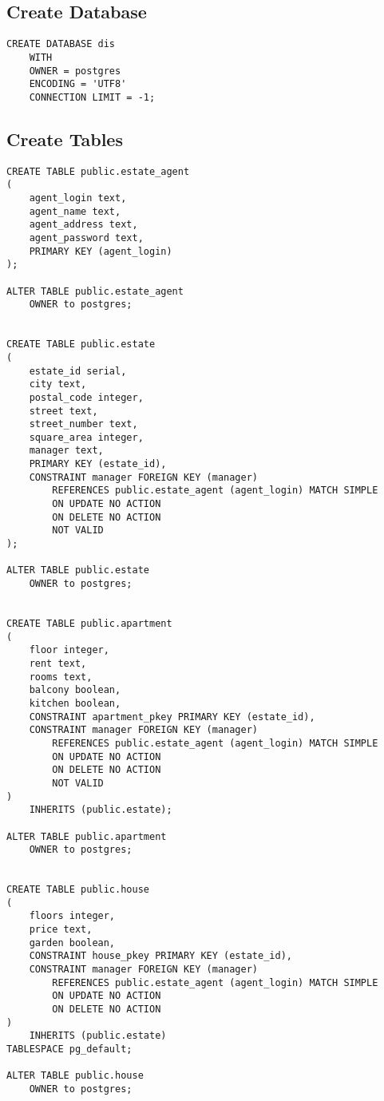 \documentclass[ngerman]{dis-template-add}
\begin{document}
\subsection*{Create Database}

\begin{verbatim}
CREATE DATABASE dis
    WITH 
    OWNER = postgres
    ENCODING = 'UTF8'
    CONNECTION LIMIT = -1;
\end{verbatim}


\subsection*{Create Tables}

\begin{verbatim}
CREATE TABLE public.estate_agent
(
    agent_login text,
    agent_name text,
    agent_address text,
    agent_password text,
    PRIMARY KEY (agent_login)
);

ALTER TABLE public.estate_agent
    OWNER to postgres;
    

CREATE TABLE public.estate
(
    estate_id serial,
    city text,
    postal_code integer,
    street text,
    street_number text,
    square_area integer,
    manager text,
    PRIMARY KEY (estate_id),
    CONSTRAINT manager FOREIGN KEY (manager)
        REFERENCES public.estate_agent (agent_login) MATCH SIMPLE
        ON UPDATE NO ACTION
        ON DELETE NO ACTION
        NOT VALID
);

ALTER TABLE public.estate
    OWNER to postgres;


CREATE TABLE public.apartment
(
    floor integer,
    rent text,
    rooms text,
    balcony boolean,
    kitchen boolean,
    CONSTRAINT apartment_pkey PRIMARY KEY (estate_id),
    CONSTRAINT manager FOREIGN KEY (manager)
        REFERENCES public.estate_agent (agent_login) MATCH SIMPLE
        ON UPDATE NO ACTION
        ON DELETE NO ACTION
        NOT VALID
)
    INHERITS (public.estate);

ALTER TABLE public.apartment
    OWNER to postgres;


CREATE TABLE public.house
(
    floors integer,
    price text,
    garden boolean,
    CONSTRAINT house_pkey PRIMARY KEY (estate_id),
    CONSTRAINT manager FOREIGN KEY (manager)
        REFERENCES public.estate_agent (agent_login) MATCH SIMPLE
        ON UPDATE NO ACTION
        ON DELETE NO ACTION
)
    INHERITS (public.estate)
TABLESPACE pg_default;

ALTER TABLE public.house
    OWNER to postgres;



\end{verbatim}
\end{document}
